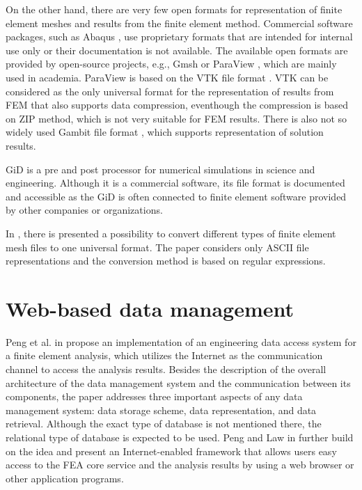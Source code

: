 

On the other hand, there are very few open formats for representation of finite element meshes and results from the finite element method. Commercial software packages, such as Abaqus \cite{Abaqus}, use proprietary formats that are intended for internal use only or their documentation is not available. The available open formats are provided by open-source projects, e.g., Gmsh \cite{Geuzaine2009} or ParaView \cite{ParaView2005}, which are mainly used in academia. ParaView is based on the VTK file format \cite{VTK2015}. VTK can be considered as the only universal format for the representation of results from FEM that also supports data compression, eventhough the compression is based on ZIP method, which is not very suitable for FEM results. There is also not so widely used Gambit file format \cite{GAMBIT}, which supports representation of solution results.

GiD \cite{GiDWeb} is a pre and post processor for numerical simulations in science and engineering. Although it is a commercial software, its file format is documented \cite{GiDPostProcess} and accessible as the GiD is often connected to finite element software provided by other companies or organizations.

In \cite{Ivanyi2012}, there is presented a possibility to convert different types of finite element mesh files to one universal format. The paper considers only ASCII file representations and the conversion method is based on regular expressions.


\section{Web-based data management}

Peng et al. in \cite{Peng2003} propose an implementation of an engineering data access system for a finite element analysis, which utilizes the Internet as the communication channel to access the analysis results. Besides the description of the overall architecture of the data management system and the communication between its components, the paper addresses three important aspects of any data management system: data storage scheme, data representation, and data retrieval. Although the exact type of database is not mentioned there, the relational type of database is expected to be used. Peng and Law in \cite{Peng2004} further build on the idea and present an Internet-enabled framework that allows users easy access to the FEA core service and the analysis results by using a web browser or other application programs.

